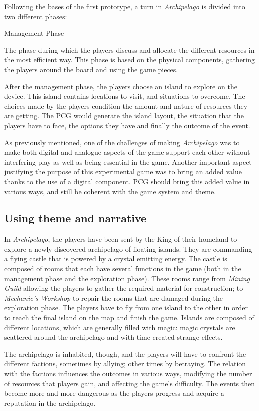 Following the bases of the first prototype, a turn in \textit{Archipelago} is divided into two different phases:
\begin{labeling}{Management Phase}
\item[\textbf{Management Phase}] The phase during which the players discuss and allocate the different resources in the most efficient way. This phase is based on the physical components, gathering the players around the board and using the game pieces.
\item[\textbf{Exploration Phase}] After the management phase, the players choose an island to explore on the device. This island contains locations to visit, and si\-tuations to overcome. The choices made by the players condition the amount and nature of resources they are getting. The PCG would generate the island layout, the situation that the players have to face, the options they have and finally the outcome of the event.
\end{labeling}
As previously mentioned, one of the challenges of making \textit{Archipelago} was to make both digital and analogue aspects of the game support each other without interfering play as well as being essential in the game. Another important aspect justifying the purpose of this experimental game was to bring an added value thanks to the use of a digital component. PCG should bring this added value in various ways, and still be coherent with the game system and theme.
\subsection{Using theme and narrative}
In \textit{Archipelago}, the players have been sent by the King of their homeland to explore a newly discovered archipelago of floating islands. They are commanding a flying castle that is powered by a crystal emitting energy. The castle is composed of rooms that each have several functions in the game (both in the management phase and the exploration phase). These rooms range from \textit{Mining Guild} allowing the players to gather the required material for construction; to \textit{Mechanic's Workshop} to repair the rooms that are damaged during the exploration phase. The players have to fly from one island to the other in order to reach the final island on the map and finish the game. Islands are composed of different locations, which are generally filled with magic: magic crystals are scattered around the archipelago and with time created strange effects.

The archipelago is inhabited, though, and the players will have to confront the different factions, sometimes by  allying; other times by betraying. The relation with the factions influences the outcomes in various ways, modifying the number of resources that players gain, and affecting the game's difficulty. The events then become more and more dangerous as the players progress and acquire a reputation in the archipelago.

